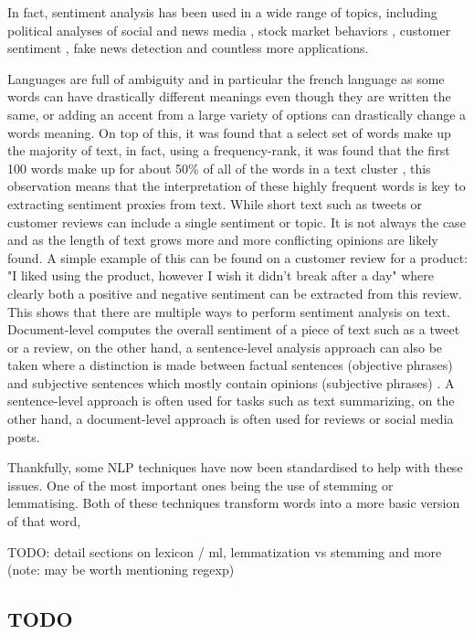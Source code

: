 In fact, sentiment analysis has been used in a wide range of topics, including political analyses of social and news media \citep{ahmad2011new}, stock market behaviors \citep{rao2012analyzing,li2014news}, customer sentiment \citep{cambria2013new,mouthami2013sentiment}, fake news detection \citep{bhutani2019fake} and countless more applications.

Languages are full of ambiguity and in particular the french language as some words can have drastically different meanings even though they are written the same, or adding an accent from a large variety of options can drastically change a words meaning. On top of this, it was found that a select set of words make up the majority of text, in fact, using a frequency-rank, it was found that the first 100 words make up for about 50\% of all of the words in a text cluster \citep{ahmad2007being}, this observation means that the interpretation of these highly frequent words is key to extracting sentiment proxies from text. While short text such as tweets \citep{chandrasekaran2020topics} or customer reviews can include a single sentiment or topic. It is not always the case and as the length of text grows more and more conflicting opinions are likely found. A simple example of this can be found on a customer review for a product: "I liked using the product, however I wish it didn't break after a day" where clearly both a positive and negative sentiment can be extracted from this review. This shows that there are multiple ways to perform sentiment analysis on text. Document-level computes the overall sentiment of a piece of text such as a tweet or a review, on the other hand, a sentence-level analysis approach can also be taken where a distinction is made between factual sentences (objective phrases) and subjective sentences which mostly contain opinions (subjective phrases) \citep{wilson2009recognizing}. A sentence-level approach is often used for tasks such as text summarizing, on the other hand, a document-level approach is often used for reviews or social media posts. 

Thankfully, some NLP techniques have now been standardised to help with these issues. One of the most important ones being the use of stemming or lemmatising. Both of these techniques transform words into a more basic version of that word, 

TODO: detail sections on lexicon / ml, lemmatization vs stemming and more (note: may be worth mentioning regexp)

\subsection{TODO}

